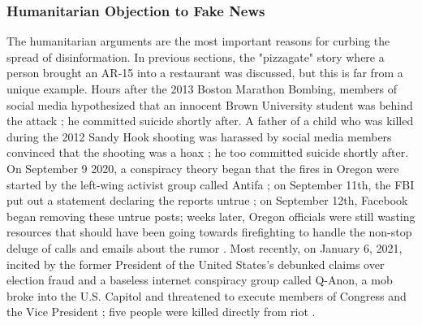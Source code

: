 \documentclass[preprint,review,12pt]{elsarticle}
\begin{document}
\subsubsection{Humanitarian Objection to Fake News}
\label{Humanitarian Objection to Fake News Section}
The humanitarian arguments are the most important reasons for curbing the spread of disinformation. In previous sections, the "pizzagate" story where a person brought an AR-15 into a restaurant was discussed, but this is far from a unique example. Hours after the 2013 Boston Marathon Bombing, members of social media hypothesized that an innocent Brown University student was behind the attack \cite{starbird2014rumors}; he committed suicide shortly after. A father of a child who was killed during the 2012 Sandy Hook shooting was harassed by social media members convinced that the shooting was a hoax \cite{williamson2019alex}; he too committed suicide shortly after. On September 9 2020, a conspiracy theory began that the fires in Oregon were started by the left-wing activist group called Antifa \cite{robinson2020oregon}; on September 11th, the FBI put out a statement declaring the reports untrue \cite{fbi2020portland}; on September 12th, Facebook began removing these untrue posts; weeks later, Oregon officials were still wasting resources that should have been going towards firefighting to handle the non-stop deluge of calls and emails about the rumor \cite{wilson2020oregon}. Most recently, on January 6, 2021, incited by the former President of the United States's debunked claims over election fraud and a baseless internet conspiracy group called Q-Anon, a mob broke into the U.S. Capitol and threatened to execute members of Congress and the Vice President \cite{fandos2021trump}; five people were killed directly from riot \cite{Levenson2021capitol}.
\end{document}

